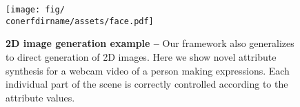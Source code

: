 \begin{figure}
  \centering
  \texttt{[image: fig/\\conerfdirname/assets/face.pdf]}
  \caption{
    {\bf 2D image generation example -- }
    Our framework also generalizes to direct generation of 2D images.
    Here we show novel attribute synthesis for a webcam video of a person
    making expressions.
    Each individual part of the scene is correctly controlled according to the
    attribute values.
  }
  \label{fig:conerf-2d-interpolation}
\end{figure}